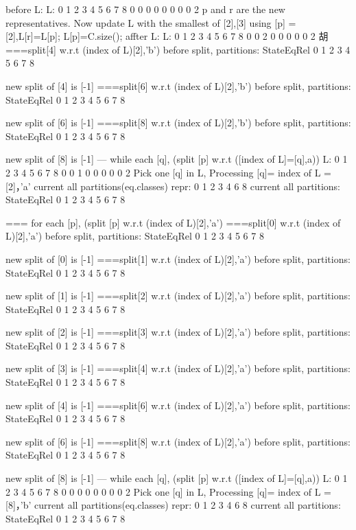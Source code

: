 before L:
L:
0 1 2 3 4 5 6 7 8
0 0 0 0 0 0 0 0 2
p and r are the new representatives. Now update L with the smallest of [2],[3]
using [p] = [2],L[r]=L[p]; L[p]=C.size();
affter L:
L:
0 1 2 3 4 5 6 7 8
0 0 2 0 0 0 0 0 2
胡
===split[4] w.r.t (index of L)[2],'b')
before split, partitions:
StateEqRel
{ 0 }
{ 1 }
{ 2 }
{ 3 }
{ 4  5 }
{ 6  7 }
{ 8 }

new split of [4] is [-1]
===split[6] w.r.t (index of L)[2],'b')
before split, partitions:
StateEqRel
{ 0 }
{ 1 }
{ 2 }
{ 3 }
{ 4  5 }
{ 6  7 }
{ 8 }

new split of [6] is [-1]
===split[8] w.r.t (index of L)[2],'b')
before split, partitions:
StateEqRel
{ 0 }
{ 1 }
{ 2 }
{ 3 }
{ 4  5 }
{ 6  7 }
{ 8 }

new split of [8] is [-1]
--- while each [q], (split [p] w.r.t ([index of L]=[q],a))
L:
0 1 2 3 4 5 6 7 8
0 0 1 0 0 0 0 0 2
Pick one [q] in L, Processing [q]= index of L = [2]，'a'
current all partitions(eq.classes) repr:
{ 0  1  2  3  4  6  8 }
current all partitions:
StateEqRel
{ 0 }
{ 1 }
{ 2 }
{ 3 }
{ 4  5 }
{ 6  7 }
{ 8 }

=== for each [p], (split [p] w.r.t (index of L)[2],'a')
===split[0] w.r.t (index of L)[2],'a')
before split, partitions:
StateEqRel
{ 0 }
{ 1 }
{ 2 }
{ 3 }
{ 4  5 }
{ 6  7 }
{ 8 }

new split of [0] is [-1]
===split[1] w.r.t (index of L)[2],'a')
before split, partitions:
StateEqRel
{ 0 }
{ 1 }
{ 2 }
{ 3 }
{ 4  5 }
{ 6  7 }
{ 8 }

new split of [1] is [-1]
===split[2] w.r.t (index of L)[2],'a')
before split, partitions:
StateEqRel
{ 0 }
{ 1 }
{ 2 }
{ 3 }
{ 4  5 }
{ 6  7 }
{ 8 }

new split of [2] is [-1]
===split[3] w.r.t (index of L)[2],'a')
before split, partitions:
StateEqRel
{ 0 }
{ 1 }
{ 2 }
{ 3 }
{ 4  5 }
{ 6  7 }
{ 8 }

new split of [3] is [-1]
===split[4] w.r.t (index of L)[2],'a')
before split, partitions:
StateEqRel
{ 0 }
{ 1 }
{ 2 }
{ 3 }
{ 4  5 }
{ 6  7 }
{ 8 }

new split of [4] is [-1]
===split[6] w.r.t (index of L)[2],'a')
before split, partitions:
StateEqRel
{ 0 }
{ 1 }
{ 2 }
{ 3 }
{ 4  5 }
{ 6  7 }
{ 8 }

new split of [6] is [-1]
===split[8] w.r.t (index of L)[2],'a')
before split, partitions:
StateEqRel
{ 0 }
{ 1 }
{ 2 }
{ 3 }
{ 4  5 }
{ 6  7 }
{ 8 }

new split of [8] is [-1]
--- while each [q], (split [p] w.r.t ([index of L]=[q],a))
L:
0 1 2 3 4 5 6 7 8
0 0 0 0 0 0 0 0 2
Pick one [q] in L, Processing [q]= index of L = [8]，'b'
current all partitions(eq.classes) repr:
{ 0  1  2  3  4  6  8 }
current all partitions:
StateEqRel
{ 0 }
{ 1 }
{ 2 }
{ 3 }
{ 4  5 }
{ 6  7 }
{ 8 }

